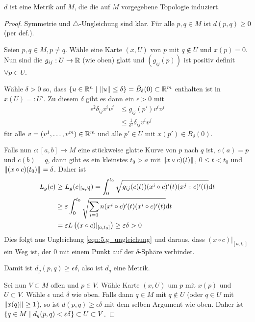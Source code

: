 \documentclass{skript}
\begin{document}
\begin{stz}
  $d$ ist eine Metrik auf $M$, die die auf $M$ vorgegebene Topologie induziert.
  \begin{proof}
    Symmetrie und $\triangle$-Ungleichung sind klar. Für alle $p,q \in M$ ist
    $d(p,q)\geq 0$ (per def.).

    Seien $p,q\in M, p\neq q$. Wähle eine Karte $(x, U)$ von $p$ mit $q\notin U$
    und $x(p) = 0$. Nun sind die $g_{ij} : U \to \mathbb{R}$ (wie oben) glatt und
    $\left( g_{ij}(p) \right)$ ist positiv definit $\forall p\in U$.

    Wähle $\delta > 0$ so, dass $\mdef[u\in \R^n]{\norm{u} \leq \delta} = \bar
    B_\delta (0) \subset \R^m$ enthalten ist in $x(U) =: U'$. Zu diesem $\delta$
    gibt es dann ein $\epsilon > 0$ mit
    \begin{align}
      \epsilon^2 \delta_{ij}v^iv^j &\leq g_{ij}(p')v^iv^j \\
      &\leq \frac{1}{\epsilon^2} \delta_{ij}v^iv^j
      \label{eqn:5.g_ungleichung}
    \end{align}
    für alle $v = (v^1,\dots,v^m)\in \mathbb{R}^m$ und alle $p'\in U$ mit $x(p')\in \bar
    B_\delta (0)$.

    Falls nun $c : [a, b] \to M$ eine stückweise glatte Kurve von $p$ nach $q$
    ist, $c(a) = p$ und $c(b) = q$, dann gibt es ein kleinstes $t_0 > a$ mit
    $\norm{x\circ c)(t)}$, $0 \leq t < t_0$ und $\norm{(x\circ c)(t_0)} =
    \delta$. Daher ist
    \begin{align}
      L_g(c) &\ge L_g(c\vert_{[a,b]}) = \int_0^{t_0} \sqrt{g_{ij}(c(t))(x^i\circ
      c)'(t)(x^j\circ c)'(t)}\mathrm d t \\
             &\ge \varepsilon \int_0^{t_0}
             \sqrt{\sum_{i=1}{n}(x^i\circ c)'(t)(x^i\circ c)'(t)}\mathrm d t \\ &= \varepsilon
             L\left( (x\circ c)\vert_{[a,t_0]} \right) \ge \varepsilon\delta > 0
             \label{eqn:5.lg_ungleichung}
    \end{align}
    Dies folgt aus Ungleichung \ref{eqn:5.g_ungleichung} und daraus, dass
    $(x\circ c)\vert_{[a,t_0]}$ ein Weg ist, der $0$ mit einem Punkt auf der
    $\delta$-Sphäre verbindet.

    Damit ist $d_g(p,q) \ge \epsilon\delta$, also ist $d_g$ eine Metrik.


    Sei nun $V \subset M$ offen und $p\in V$. Wähle Karte $(x, U)$ um $p$ mit
    $x(p)$ und $U \subset V$. Wähle $\epsilon$ und $\delta$ wie oben. Falls dann
    $q\in M$ mit $q\notin U$ (oder $q\in U$ mit $\norm{x(q)}\ge 1$), so ist
    $d(p,q) \ge \epsilon\delta$ mit dem selben Argument wie oben. Daher ist
    $\mdef[q\in M]{d_g(p,q)<\epsilon\delta}\subset U \subset V$.


\end{proof}
\end{stz}
\end{document}
